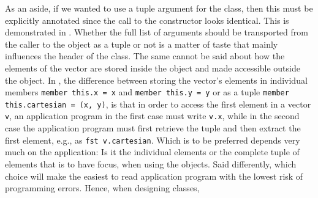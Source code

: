 As an aside, if we wanted to use a tuple argument for the class, then this must be explicitly annotated since the call to the constructor looks identical. This is demonstrated in .
%
%
Whether the full list of arguments should be transported from the caller to the object as a tuple or not is a matter of taste that mainly influences the header of the class. The same cannot be said about how the elements of the vector are stored inside the object and made accessible outside the object. In , the difference between storing the vector's elements in individual members \lstinline{member this.x = x} and \lstinline{member this.y = y} or as a tuple \lstinline{member this.cartesian = (x, y)}, is that in order to access the first element in a vector \lstinline{v}, an application program in the first case must write \lstinline{v.x}, while in the second case the application program must first retrieve the tuple and then extract the first element, e.g., as \lstinline{fst v.cartesian}. Which is to be preferred depends very much on the application: Is it the individual elements or the complete tuple of elements that is to have focus, when using the objects. Said differently, which choice will make the easiest to read application program with the lowest risk of programming errors. Hence, when designing classes, 

